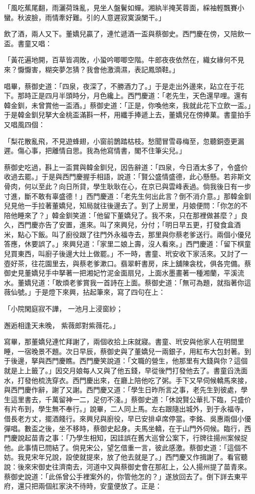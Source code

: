「風吃蕉尾翻，雨灑荷珠亂，見坐人盤鬢如蟬。湘紈半掩芙蓉面，綵袖輕飄賽小蠻。秋波臉，雨情牽好難。引的人意遲寂寞淚闌干。」

飲了酒，兩人又下。董嬌兒贏了，連忙遞酒一盃與蔡御史。西門慶在傍，又陪飲一盃。書童又唱：

「黃花遍地開，百草皆凋敗，小蛩吟唧唧空階。牛郎夜夜依然在，織女緣何不見來？懨懨害，糊突夢怎猜？我會他激滴濕，表記鳳頭鞋。」

唱畢，蔡御史道：「四泉，夜深了，不勝酒力了。」于是走出外邊來，跕立在于花下。那時正是四月半頭時分，月色纔上。西門慶道：「老先生，天色還早哩。還有韓金釧，未曾賞他一盃酒。」蔡御史道：「正是，你喚他來，我就此花下立飲一盃。」于是韓金釧兒拏大金桃盃滿斟一杯，用纖手捧遞上去，董嬌兒在傍捧菓。書童拍手又唱風四個：

「梨花散亂飛，不見遊蜂翅，小窗前鵲踏枯枝。愁聞冒雪尋梅至，忽聽銅壺更漏遲。傷心事，把離情自思。我為他寫情書，閣不住筆尖兒。」

蔡御史吃過，斟上一盃賞與韓金釧兒，因告辭道：「四泉，今日酒太多了，令盛价收過去罷。」于是與西門慶握手相語，說道：「賢公盛情盛德，此心懸懸。若非斯文骨肉，何以至此？向日所貸，學生耿耿在心，在京已與雲峰表過。倘我後日有一步寸進，斷不敢有辜盛德！」西門慶道：「老先生何出此言？倒不消介意。」那韓金釧兒見他一手拉著董嬌兒，知局就往後邊去了。到了上房里，月娘便問：「你怎的不陪他睡來了？」韓金釧笑道：「他留下董嬌兒了。我不來，只在那裡做甚麼？」良久，西門慶亦告了安置，進來。叫了來興兒，分付；「明日早五更，打發食盒酒米，點心下飯。叫了廚役跟了往門外永福寺去，那里與你蔡老爹送行。兩個小優兒答應，休要誤了。」來興兒道：「家里二娘上壽，沒人看來。」西門慶道：「留下棋童兒買東西，叫廚子後邊大灶上做罷。」不一時，書童、玳安收下家活來。又討了一壺好茶，往花園里去，與蔡老爹漱口。翡翠軒書房，床上舖陳衾枕，俱各完備。蔡御史見董嬌兒手中拏著一把湘妃竹泥金面扇兒，上面水墨畫著一種湘蘭，平溪流水。董嬌兒道：「敢煩老爹賞我一首詩在上面。蔡御史道：「無可為題，就指著你這薇仙號。」于是燈下來興，拈起筆來，寫了四句在上：

「小院閑庭寂不譁，  一池月上浸窗紗；

邂逅相逢天未晚，  紫薇郎對紫薇花。」

寫畢，那董嬌兒連忙拜謝了，兩個收拾上床就寢。書童、玳安與他家人在明間里睡，一宿晚景不題。次日早辰，蔡御史與了董嬌兒一兩銀子，用紅布大包封著。到于後邊，拏與西門慶瞧。西門慶笑說道：「文職的營生，他那里有大錢與你？這個就是上上籤了。」因交月娘每人又與了他五錢，早從後門打發他去了。書童舀洗面水，打發他梳洗穿衣。西門慶出來，在廳上陪他吃了粥。手下又早伺候轎馬來接，與西門慶作辭，謝了又謝。西門慶又道：「學生日昨所言之事，老先生到彼處，學生這里書去，千萬留神一二，足仞不淺。」蔡御史道：「休說賢公華扎下臨，只盛价有片布到，學生無不奉行。」說畢，二人同上馬。左右跟隨出城外，到于永福寺，借長老方丈，擺酒餞行。來興兒與廚役，早已安排卓席停當。李銘、吳惠兩個小優彈唱。數盃之後，坐不移時，蔡御史起身。夫馬坐轎，在于山門外伺候。臨行，西門慶說起苗青之事：「乃學生相知，因詿誤在舊大巡曾公案下，行牌往揚州案候捉他。此事情已問結了。倘見宋公，望乞借重一言，彼此感激。蔡御史道：「這個不妨。我見宋年兄說，設使就提來，放了他去就是了。」西門慶又作揖謝了。看官聽說：後來宋御史往濟南去，河道中又與蔡御史會在那舡上，公人揚州提了苗青來。蔡御史說道：「此係曾公手裡案外的，你管他怎的？」遂放回去了。倒下詳去東平府，還只把兩個舡家決不待時，安童便放了。正是：

